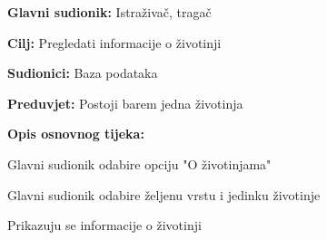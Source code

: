 					\noindent {}
					\begin{packed_item}
	
						\item \textbf{Glavni sudionik: } Istraživač, tragač
						\item  \textbf{Cilj:} Pregledati informacije o životinji
						\item  \textbf{Sudionici:} Baza podataka
						\item  \textbf{Preduvjet:} Postoji barem jedna životinja
						\item  \textbf{Opis osnovnog tijeka:}
						
						\item[] \begin{packed_enum}
	
							\item Glavni sudionik odabire opciju "O životinjama"
							\item Glavni sudionik odabire željenu vrstu i jedinku životinje
							\item Prikazuju se informacije o životinji
						
						\end{packed_enum}
					\end{packed_item}
				
